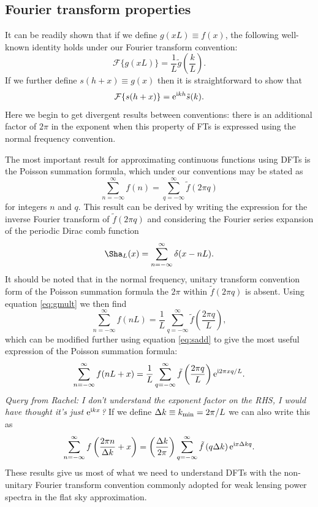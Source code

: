 \documentclass[preprint]{aastex}
\newcommand{\mi}{{\rm i}}
\newcommand{\me}{{\rm e}}
\begin{document}
\subsection{Fourier transform properties}
It can be readily shown that if we define $g(x L) \equiv f(x)$, the following well-known identity holds
under our Fourier transform convention:
\begin{equation}
\mathcal{F}\{g(x L)\} = \frac{1}{L}
\tilde{g}\left(\frac{k}{L}\right). \label{eq:gmult}
\end{equation}
If we further define $s(h + x) \equiv g(x)$ then it is straightforward
to show that
\begin{equation}
\mathcal{F}\{ s(h + x) \} = \me^{\mi k h} \tilde{s}(k).  \label{eq:sadd}
\end{equation}
Here we begin to get divergent results between conventions: there is
an additional factor of $2\pi$ in the exponent when this property of
FTs is expressed using the normal frequency
convention.

The most important result for approximating continuous functions using
DFTs is the Poisson summation formula, which under our conventions may
be stated as
\begin{equation}
\sum_{n=-\infty}^{\infty} f(n) = \sum_{q=-\infty}^{\infty} \tilde{f}(2
\pi q)
\end{equation}
for integers $n$ and $q$.  This result can be derived by writing the
  expression for the inverse Fourier transform of $\tilde{f}(2 \pi
q)$ and considering the Fourier series expansion of the periodic Dirac comb
function
\begin{equation}
\Sha_L (x) = \sum_{n=-\infty}^{\infty} \delta(x - nL).
\end{equation}
It should be noted that in the normal frequency, unitary transform
convention form of the Poisson summation formula the $2\pi$ within $\tilde{f}(2 \pi
q)$ is absent.  Using equation \eqref{eq:gmult} we then find
\begin{equation}
\sum_{n=-\infty}^{\infty} f(n L) = \frac{1}{L}
\sum_{q=-\infty}^{\infty} \tilde{f} \left(\frac{2 \pi q}{L} \right),
\end{equation}
which can be modified further using equation \eqref{eq:sadd} to give
the most useful expression of the Poisson summation formula:
\begin{equation}
\sum_{n=-\infty}^{\infty} f(n L + x) = \frac{1}{L}
\sum_{q=-\infty}^{\infty} \tilde{f} \left(\frac{2 \pi  q}{L} \right)
\me^{\mi 2 \pi x q / L}.
\end{equation}
{\it Query from Rachel: I don't understand the exponent factor on the RHS,
  I would have thought it's just $\me^{\mi k x}$?}
If we define $\Delta k \equiv k_{\rm min} = 2 \pi / L$ we can also write
this as
\begin{equation}
\sum_{n=-\infty}^{\infty} f\left(\frac{2\pi n}{\Delta k} + x \right) = 
\left(\frac{\Delta k}{2 \pi} \right)
\sum_{q=-\infty}^{\infty} \tilde{f} \left(q \Delta k \right)
\me^{\mi x \Delta k q }. \label{eq:poisson}
\end{equation}
These results give us most of what we need to understand DFTs with the
non-unitary Fourier transform convention commonly adopted for weak
lensing power spectra in the flat sky approximation.
\end{document}
